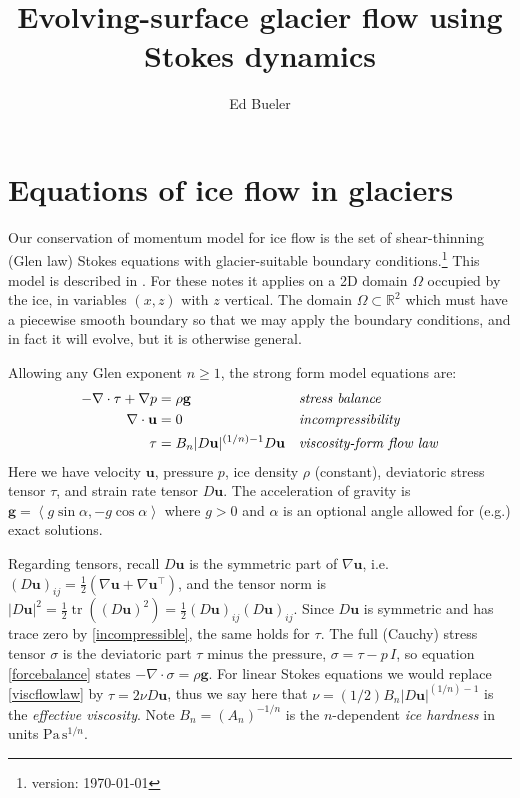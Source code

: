 \documentclass[letterpaper,final,12pt,reqno]{amsart}
\newcommand{\RR}{\mathbb{R}}
\newcommand{\grad}{\nabla}
\newcommand{\Div}{\nabla\cdot}
\newcommand{\trace}{\operatorname{tr}}
\newcommand{\bg}{\mathbf{g}}
\newcommand{\bu}{\mathbf{u}}
\begin{document}
\title{Evolving-surface glacier flow using Stokes dynamics}

\author{Ed Bueler}

\maketitle

\thispagestyle{empty}
\bigskip

\section{Equations of ice flow in glaciers} \label{sec:strongform}

Our conservation of momentum model for ice flow is the set of shear-thinning (Glen law) Stokes equations with glacier-suitable boundary conditions.\footnote{version: \today}  This model is described in \cite{GreveBlatter2009,JouvetRappaz2011}.  For these notes it applies on a 2D domain $\Omega$ occupied by the ice, in variables $(x,z)$ with $z$ vertical.  The domain $\Omega \subset \RR^2$ which must have a piecewise smooth boundary so that we may apply the boundary conditions, and in fact it will evolve, but it is otherwise general.

Allowing any Glen exponent $n\ge 1$, the strong form model equations are:
\begin{align}
- \nabla \cdot \tau + \nabla p &= \rho \bg &&\text{\emph{stress balance}} \label{forcebalance} \\
\nabla \cdot \bu &= 0 &&\text{\emph{incompressibility}} \label{incompressible} \\
\tau &= B_n |D\bu|^{(1/n) - 1} D\bu  &&\text{\emph{viscosity-form flow law}} \label{viscflowlaw}
\end{align}
Here we have velocity $\bu$, pressure $p$, ice density $\rho$ (constant), deviatoric stress tensor $\tau$, and strain rate tensor $D\bu$.  The acceleration of gravity is $\bg = \left<g\sin\alpha,-g\cos\alpha\right>$ where $g>0$ and $\alpha$ is an optional angle allowed for (e.g.) exact solutions.

Regarding tensors, recall $D\bu$ is the symmetric part of $\grad \bu$, i.e.~$(D\bu)_{ij} = \frac{1}{2} \left(\grad\bu + \grad\bu^\top\right)$, and the tensor norm is $|D\bu|^2 = \frac{1}{2} \trace\left((D\bu)^2\right) = \frac{1}{2} (D\bu)_{ij} (D\bu)_{ij}$.  Since $D\bu$ is symmetric and has trace zero by \eqref{incompressible}, the same holds for $\tau$.  The full (Cauchy) stress tensor $\sigma$ is the deviatoric part $\tau$ minus the pressure, $\sigma = \tau - p\,I$, so equation \eqref{forcebalance} states $-\Div \sigma = \rho \bg$.  For linear Stokes equations we would replace \eqref{viscflowlaw} by $\tau = 2\nu D\bu$, thus we say here that $\nu=(1/2)B_n |D\bu|^{(1/n) - 1}$ is the \emph{effective viscosity}.  Note $B_n = (A_n)^{-1/n}$ is the $n$-dependent \emph{ice hardness} in units $\text{Pa}\,\text{s}^{1/n}$.
\end{document}
